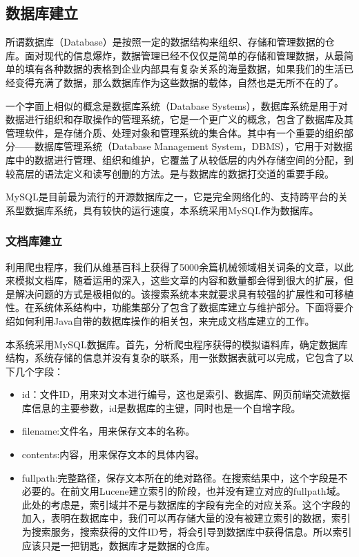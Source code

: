 \documentclass[12pt,a4paper]{article}
\begin{document}
	\subsection{数据库建立}
	所谓数据库（Database）是按照一定的数据结构来组织、存储和管理数据的仓库。面对现代的信息爆炸，数据管理已经不仅仅是简单的存储和管理数据，从最简单的填有各种数据的表格到企业内部具有复杂关系的海量数据，如果我们的生活已经变得充满了数据，那么数据库作为这些数据的载体，自然也是无所不在的了。
	
	一个字面上相似的概念是数据库系统（Database Systems），数据库系统是用于对数据进行组织和存取操作的管理系统，它是一个更广义的概念，包含了数据库及其管理软件，是存储介质、处理对象和管理系统的集合体。其中有一个重要的组织部分——数据库管理系统（Database Management System，DBMS），它用于对数据库中的数据进行管理、组织和维护，它覆盖了从较低层的内外存储空间的分配，到较高层的语法定义和读写创删的方法。是与数据库的数据打交道的重要手段。
	
	MySQL是目前最为流行的开源数据库之一，它是完全网络化的、支持跨平台的关系型数据库系统，具有较快的运行速度，本系统采用MySQL作为数据库。
			
		\subsubsection{文档库建立}
	利用爬虫程序，我们从维基百科上获得了5000余篇机械领域相关词条的文章，以此来模拟文档库，随着运用的深入，这些文章的内容和数量都会得到很大的扩展，但是解决问题的方式是极相似的。该搜索系统本来就要求具有较强的扩展性和可移植性。在系统体系结构中，功能集部分了包含了数据库建立与维护部分。下面将要介绍如何利用Java自带的数据库操作的相关包，来完成文档库建立的工作。
	
	本系统采用MySQL数据库。首先，分析爬虫程序获得的模拟语料库，确定数据库结构，系统存储的信息并没有复杂的联系，用一张数据表就可以完成，它包含了以下几个字段：
	\begin{itemize}
		\item
	id：文件ID，用来对文本进行编号，这也是索引、数据库、网页前端交流数据库信息的主要参数，id是数据库的主键，同时也是一个自增字段。
		\item
	filename:文件名，用来保存文本的名称。
		\item
	contents:内容，用来保存文本的具体内容。
		\item
	fullpath:完整路径，保存文本所在的绝对路径。在搜索结果中，这个字段是不必要的。在前文用Lucene建立索引的阶段，也并没有建立对应的fullpath域。此处的考虑是，索引域并不是与数据库的字段有完全的对应关系。这个字段的加入，表明在数据库中，我们可以再存储大量的没有被建立索引的数据，索引为搜索服务，搜索获得的文件ID号，将会引导到数据库中获得信息。所以索引应该只是一把钥匙，数据库才是数据的仓库。
	\end{itemize}
	
\end{document}
